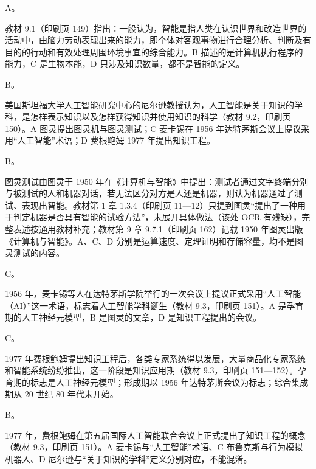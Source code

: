 \documentclass[a4paper,11pt]{article}
\begin{document}


\q A。\begin{analysis}教材 9.1（印刷页 149）指出：一般认为，智能是指人类在认识世界和改造世界的活动中，由脑力劳动表现出来的能力，即个体对客观事物进行合理分析、判断及有目的的行动和有效处理周围环境事宜的综合能力。B 描述的是计算机执行程序的能力，C 是生物本能，D 只涉及知识数量，都不是智能的定义。\end{analysis}

\q B。\begin{analysis}美国斯坦福大学人工智能研究中心的尼尔逊教授认为，人工智能是关于知识的学科，是怎样表示知识以及怎样获得知识并使用知识的科学（教材 9.2，印刷页 150）。A 图灵提出图灵机与图灵测试；C 麦卡锡在 1956 年达特茅斯会议上提议采用“人工智能”术语；D 费根鲍姆 1977 年提出知识工程。\end{analysis}

\q B。\begin{analysis}图灵测试由图灵于 1950 年在《计算机与智能》中提出：测试者通过文字终端分别与被测试的人和机器对话，若无法区分对方是人还是机器，则认为机器通过了测试、表现出智能。教材第 1 章 1.3.4（印刷页 11—12）只提到图灵“提出了一种用于判定机器是否具有智能的试验方法”，未展开具体做法（该处 OCR 有残缺），完整表述按通用教材补充；教材第 9 章 9.7.1（印刷页 162）记载 1950 年图灵出版《计算机与智能》。A、C、D 分别是运算速度、定理证明和存储容量，均不是图灵测试的内容。\end{analysis}

\q C。\begin{analysis}1956 年，麦卡锡等人在达特茅斯学院举行的一次会议上提议正式采用“人工智能（AI）”这一术语，标志着人工智能学科诞生（教材 9.3，印刷页 151）。A 是孕育期的人工神经元模型，B 是图灵的文章，D 是知识工程提出的会议。\end{analysis}

\q C。\begin{analysis}1977 年费根鲍姆提出知识工程后，各类专家系统得以发展，大量商品化专家系统和智能系统纷纷推出，这一阶段是知识应用期（教材 9.3，印刷页 151—152）。孕育期的标志是人工神经元模型；形成期以 1956 年达特茅斯会议为标志；综合集成期从 20 世纪 80 年代末开始。\end{analysis}

\q B。\begin{analysis}1977 年，费根鲍姆在第五届国际人工智能联合会议上正式提出了知识工程的概念（教材 9.3，印刷页 151）。A 麦卡锡与“人工智能”术语、C 布鲁克斯与行为模拟机器人、D 尼尔逊与“关于知识的学科”定义分别对应，不能混淆。\end{analysis}
\end{document}
